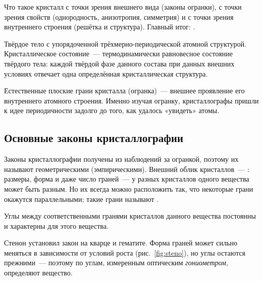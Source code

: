 \begin{orientir}
Что такое кристалл с точки зрения внешнего вида (законы огранки), с
точки зрения свойств (однородность, анизотропия, симметрия) и с точки
зрения внутреннего строения (решётка и структура). Главный итог:
.
\end{orientir}

\begin{opredelenie}[Кристалл]
Твёрдое тело с упорядоченной трёхмерно-периодической атомной
структурой. Кристаллическое состояние~— термодинамически равновесное
состояние твёрдого тела: каждой твёрдой фазе данного состава при данных
внешних условиях отвечает одна определённая кристаллическая структура.
\end{opredelenie}

Естественные плоские грани кристалла (огранка)~— внешнее проявление его
внутреннего атомного строения. Именно изучая огранку, кристаллографы
пришли к идее периодичности задолго до того, как удалось «увидеть» атомы.

\subsection{Основные законы кристаллографии}\label{ssec:laws}

Законы кристаллографии получены из наблюдений за огранкой, поэтому их
называют геометрическими (эмпирическими). Внешний облик кристаллов~—
: размеры, форма и даже число граней~— у разных кристаллов
одного вещества может быть разным. Но их всегда можно расположить так,
что некоторые грани окажутся параллельными; такие грани называют
.

\begin{glavnoe}
Углы между соответственными гранями кристаллов данного вещества
постоянны и характерны для этого вещества.
\end{glavnoe}

Стенон установил закон на кварце и гематите. Форма граней может сильно
меняться в зависимости от условий роста (рис.~\ref{fig:steno}), но углы
остаются прежними~— поэтому по углам, измеренным оптическим
\emph{гониометром}, определяют вещество.

